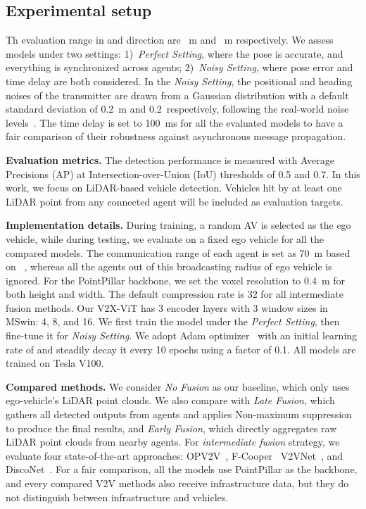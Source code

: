 \documentclass[runningheads]{llncs}
\begin{document}
\subsection{Experimental setup}
Th evaluation range in  and  direction are ~m and ~m respectively.  
We assess models under two settings: 1)~\textit{Perfect Setting}, where the pose is accurate, and everything is synchronized across agents; 2)~\textit{Noisy Setting}, where pose error and time delay are both considered. In the \textit{Noisy Setting},  the positional and heading noises of the transmitter are drawn from a Gaussian distribution with a default standard deviation of 0.2~m and 0.2\textdegree~respectively, following the real-world noise levels~\cite{xia2021advancing,li2020toward,RT3000}. The time delay is set to 100~ms for all the evaluated models to have a fair comparison of their robustness against asynchronous message propagation.

\noindent\textbf{Evaluation metrics.} 
The detection performance is measured with Average Precisions (AP) at Intersection-over-Union (IoU) thresholds of 0.5 and 0.7. In this work, we focus on LiDAR-based vehicle detection. Vehicles hit by at least one LiDAR point from any connected agent will be included as evaluation targets.

\noindent\textbf{Implementation details.}
During training, a random AV is selected as the ego vehicle, while during testing, we evaluate on a fixed ego vehicle for all the compared models.  The communication range of each agent is set as 70~m based on ~\cite{kenney2011dedicated}, whereas all the agents out of this broadcasting radius of ego vehicle is ignored. For the PointPillar backbone, we set the voxel resolution to 0.4~m for both height and width. The default compression rate is 32 for all intermediate fusion methods. Our V2X-ViT has 3 encoder layers with 3 window sizes in MSwin: 4, 8, and 16. We first train the model under the \textit{Perfect Setting}, then fine-tune it for \textit{Noisy Setting}. We adopt Adam optimizer~\cite{kingma2014adam} with an initial learning rate of  and steadily decay it every 10 epochs using a factor of 0.1. All models are trained on Tesla V100.

\noindent\textbf{Compared methods.} We consider \textit{No Fusion} as our baseline, which only uses ego-vehicle's LiDAR point clouds.
We also compare with \textit{Late Fusion}, which gathers all detected outputs from agents and applies Non-maximum suppression to produce the final results, and \textit{Early Fusion}, which directly aggregates raw LiDAR point clouds from nearby agents. For \textit{intermediate fusion} strategy, we evaluate four state-of-the-art approaches: OPV2V~\cite{xu2021opv2v}, F-Cooper~\cite{chen2019f} V2VNet~\cite{wang2020v2vnet}, and DiscoNet~\cite{li2021learning}.
For a fair comparison, all the models use PointPillar as the backbone, and every compared V2V methods also receive infrastructure data, but they do not distinguish between infrastructure and vehicles.
\end{document}
